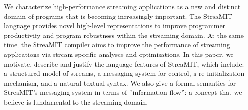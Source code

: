 We characterize high-performance streaming applications as a new and
distinct domain of programs that is becoming increasingly important.
The StreaMIT language provides novel high-level representations to
improve programmer productivity and program robustness within the
streaming domain.  At the same time, the StreaMIT compiler aims to
improve the performance of streaming applications via stream-specific
analyses and optimizations.  In this paper, we motivate, describe and
justify the language features of StreaMIT, which include: a structured
model of streams, a messaging system for control, a re-initialization
mechanism, and a natural textual syntax.  We also give a formal
semantics for StreaMIT's messaging system in terms of ``information
flow'': a concept that we believe is fundamental to the streaming
domain.
